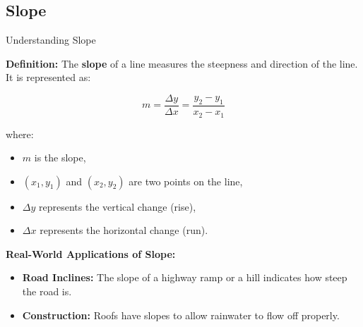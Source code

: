 \documentclass{beamer}
\begin{document}
\begin{frame}
\section{Slope}
\end{frame}
\begin{frame}{Understanding Slope}

    \textbf{Definition:}  
    The \textbf{slope} of a line measures the steepness and direction of the line. It is represented as:

    \[
    m = \frac{\Delta y}{\Delta x} = \frac{y_2 - y_1}{x_2 - x_1}
    \]

    where:
    \begin{itemize}
        \item \( m \) is the slope,
        \item \( (x_1, y_1) \) and \( (x_2, y_2) \) are two points on the line,
        \item \( \Delta y \) represents the vertical change (rise),
        \item \( \Delta x \) represents the horizontal change (run).
    \end{itemize}

    \vspace{0.5cm}
    \textbf{Real-World Applications of Slope:}
    \begin{itemize}
        \item \textbf{Road Inclines:} The slope of a highway ramp or a hill indicates how steep the road is.
        \item \textbf{Construction:} Roofs have slopes to allow rainwater to flow off properly.

    \end{itemize}

\end{frame}
\end{document}
